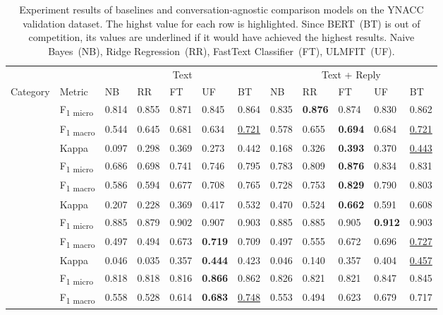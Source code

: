 \begin{table}
\small
\caption{Experiment results of baselines and conversation-agnostic comparison models on the YNACC validation dataset. The highst value for each row is highlighted. Since BERT~(BT) is out of competition, its values are underlined if it would have achieved the highest results. Naive Bayes~(NB), Ridge Regression~(RR), FastText Classifier~(FT), ULMFIT~(UF).}
\begin{tabular}{ l l l l l l l l l l l l}
\toprule
\multicolumn{2}{l}{} & \multicolumn{5}{c}{Text} & \multicolumn{5}{c}{Text + Reply} \\
\cmidrule(r){3-7}
\cmidrule(r){8-12}
Category & Metric &  NB & RR & FT & UF & BT & NB & RR & FT & UF & BT\\
\midrule
\addlinespace[2ex]
\multirow{3}{*}{Persuasive} & F\textsubscript{1 micro} & 0.814 & 0.855 & 0.871 & 0.845 & 0.864 & 0.835 & \textbf{0.876} & 0.874 & 0.830 & 0.862 \\
& F\textsubscript{1 macro} & 0.544 & 0.645 & 0.681 & 0.634 & \underline{0.721} & 0.578 & 0.655 & \textbf{0.694} & 0.684 & \underline{0.721} \\
& Kappa & 0.097 & 0.298 & 0.369 & 0.273 & 0.442 & 0.168 & 0.326 & \textbf{0.393} & 0.370 & \underline{0.443} \\ \addlinespace[2ex]
\multirow{3}{*}{Audience} & F\textsubscript{1 micro} & 0.686 & 0.698 & 0.741 & 0.746 & 0.795 & 0.783 & 0.809 & \textbf{0.876} & 0.834 & 0.831 \\
& F\textsubscript{1 macro} & 0.586 & 0.594 & 0.677 & 0.708 & 0.765 & 0.728 & 0.753 & \textbf{0.829} & 0.790 & 0.803 \\
& Kappa & 0.207 & 0.228 & 0.369 & 0.417 & 0.532 & 0.470 & 0.524 & \textbf{0.662} & 0.591 & 0.608 \\ \addlinespace[2ex]
\multirow{3}{*}{Agreement} & F\textsubscript{1 micro} & 0.885 & 0.879 & 0.902 & 0.907 & 0.903 & 0.885 & 0.885 & 0.905 & \textbf{0.912} & 0.903 \\
& F\textsubscript{1 macro} & 0.497 & 0.494 & 0.673 & \textbf{0.719} & 0.709 & 0.497 & 0.555 & 0.672 & 0.696 & \underline{0.727} \\
& Kappa & 0.046 & 0.035 & 0.357 & \textbf{0.444} & 0.423 & 0.046 & 0.140 & 0.357 & 0.404 & \underline{0.457} \\ \addlinespace[2ex]
\multirow{3}{*}{Informat.} & F\textsubscript{1 micro} & 0.818 & 0.818 & 0.816 & \textbf{0.866} & 0.862 & 0.826 & 0.821 & 0.821 & 0.847 & 0.845 \\
& F\textsubscript{1 macro} & 0.558 & 0.528 & 0.614 & \textbf{0.683} & \underline{0.748} & 0.553 & 0.494 & 0.623 & 0.679 & 0.717 \\

\end{tabular}
\end{table}
